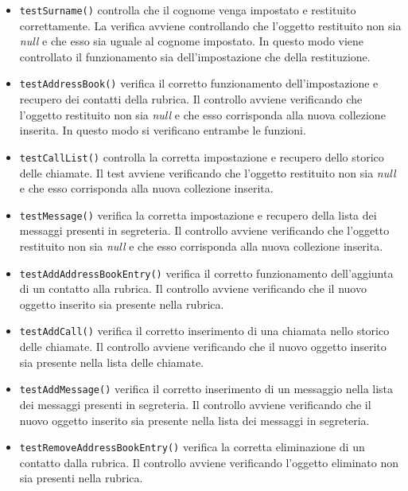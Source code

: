 \begin{itemize}
\begin{itemize}
\item \texttt{testSurname()} controlla che il cognome venga impostato e restituito correttamente. La verifica avviene controllando che l'oggetto restituito non sia \textit{null} e che esso sia uguale al cognome impostato. In questo modo viene controllato il funzionamento sia dell'impostazione che della restituzione.

\item \texttt{testAddressBook()} verifica il corretto funzionamento dell'impostazione e recupero dei contatti della rubrica.
Il controllo avviene verificando che l'oggetto restituito non sia \textit{null} e che esso corrisponda alla nuova collezione inserita.
In questo modo si verificano entrambe le funzioni.

\item \texttt{testCallList()} controlla la corretta impostazione e recupero dello storico delle chiamate.
Il test avviene verificando che l'oggetto restituito non sia \textit{null} e che esso corrisponda alla nuova collezione inserita.

\item \texttt{testMessage()} verifica la corretta impostazione e recupero della lista dei messaggi presenti in segreteria.
Il controllo avviene verificando che l'oggetto restituito non sia \textit{null} e che esso corrisponda alla nuova collezione inserita.

\item \texttt{testAddAddressBookEntry()} verifica il corretto funzionamento dell'aggiunta di un contatto alla rubrica.
Il controllo avviene verificando che il nuovo oggetto inserito sia presente nella rubrica.

\item \texttt{testAddCall()} verifica il corretto inserimento di una chiamata nello storico delle chiamate.
Il controllo avviene verificando che il nuovo oggetto inserito sia presente nella lista delle chiamate. 

\item \texttt{testAddMessage()}  verifica il corretto inserimento di un messaggio nella lista dei messaggi presenti in segreteria.
Il controllo avviene verificando che il nuovo oggetto inserito sia presente nella lista dei messaggi in segreteria. 

\item \texttt{testRemoveAddressBookEntry()} verifica la corretta eliminazione di un contatto dalla rubrica.
Il controllo avviene verificando l'oggetto eliminato non sia presenti nella rubrica.  


\end{itemize}
\end{itemize}
